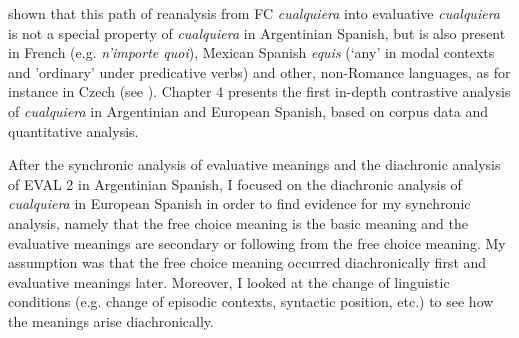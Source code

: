 shown that this path of reanalysis from FC \textit{cualquiera} into evaluative \textit{cualquiera} is not a special property of \textit{cualquiera} in Argentinian Spanish, but is also present in French (e.g. \textit{n’importe quoi}), Mexican Spanish \textit{equis} (‘any’ in modal contexts and ’ordinary’ under predicative verbs) \citep{Author2020} and other, non-Romance languages, as for instance in Czech (see \citealt{Šimík2008}). Chapter 4 presents the first in-depth contrastive analysis of \textit{cualquiera} in Argentinian and European Spanish, based on corpus data and quantitative analysis. 

  After the synchronic analysis of evaluative meanings and the diachronic analysis of EVAL 2 in Argentinian Spanish, I focused on the diachronic analysis of \textit{cualquiera} in European Spanish in order to find evidence for my synchronic analysis, namely that the free choice meaning is the basic meaning and the evaluative meanings are secondary or following from the free choice meaning. My assumption was that the free choice meaning occurred diachronically first and evaluative meanings later. Moreover, I looked at the change of linguistic conditions (e.g. change of episodic contexts, syntactic position, etc.) to see how the meanings arise diachronically. 

